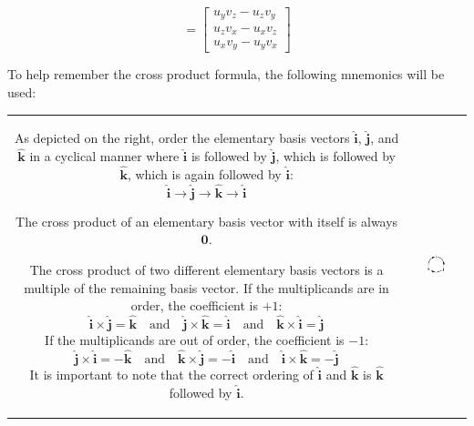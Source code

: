 \documentclass{article}
\begin{document}
\begin{center}
\[= \begin{bmatrix} u_y v_z - u_z v_y \\ u_z v_x - u_x v_z \\ u_x v_y - u_y v_x \end{bmatrix}\]
\end{center}

To help remember the cross product formula, the following mnemonics will be used:
\begin{center}
\begin{tabular}{cc}
\parbox{0.6\textwidth}{
As depicted on the right, order the elementary basis vectors \(\hat{\mathbf{i}}\), \(\hat{\mathbf{j}}\), and \(\hat{\mathbf{k}}\) in a cyclical manner where \(\hat{\mathbf{i}}\) is followed by \(\hat{\mathbf{j}}\), which is followed by \(\hat{\mathbf{k}}\), which is again followed by \(\hat{\mathbf{i}}\): 
\[\hat{\mathbf{i}} \rightarrow \hat{\mathbf{j}} \rightarrow \hat{\mathbf{k}} \rightarrow \hat{\mathbf{i}}\] 

The cross product of an elementary basis vector with itself is always \(\mathbf{0}\).  

The cross product of two different elementary basis vectors is a multiple of the remaining basis vector. If the multiplicands are in order, the coefficient is \(+1\):
\[\hat{\mathbf{i}} \times \hat{\mathbf{j}} = \hat{\mathbf{k}} \quad\text{and}\quad \hat{\mathbf{j}} \times \hat{\mathbf{k}} = \hat{\mathbf{i}} \quad\text{and}\quad \hat{\mathbf{k}} \times \hat{\mathbf{i}} = \hat{\mathbf{j}}\] 
If the multiplicands are out of order, the coefficient is \(-1\):
\[\hat{\mathbf{j}} \times \hat{\mathbf{i}} = -\hat{\mathbf{k}} \quad\text{and}\quad \hat{\mathbf{k}} \times \hat{\mathbf{j}} = -\hat{\mathbf{i}} \quad\text{and}\quad \hat{\mathbf{i}} \times \hat{\mathbf{k}} = -\hat{\mathbf{j}}\] 
It is important to note that the correct ordering of \(\hat{\mathbf{i}}\) and \(\hat{\mathbf{k}}\) is \(\hat{\mathbf{k}}\) followed by \(\hat{\mathbf{i}}\).
} & \parbox{0.4\textwidth}{
\includegraphics[width = 0.4\textwidth]{i_j_k_cycle}
}
\end{tabular}
\end{center}
\end{document}
